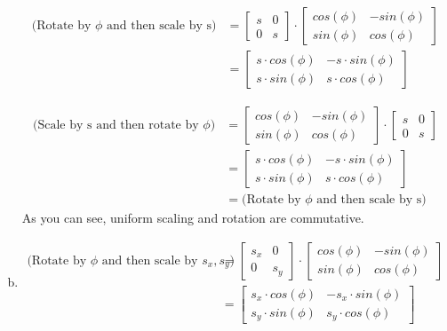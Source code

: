 \documentclass{article} %
\begin{document}
\begin{enumerate}[a)]
\begin{align*}
\text{(Rotate by $\phi$ and then scale by s)} &=
\left[
\begin{matrix}
s & 0\\
0 & s
\end{matrix}
\right]
\cdot
\left[
\begin{matrix}
cos(\phi) & -sin(\phi)\\
sin(\phi) & cos(\phi)
\end{matrix}
\right]\\
&= \left[
\begin{matrix}
s \cdot cos(\phi)  & -s \cdot sin(\phi)\\
s \cdot sin(\phi) & s \cdot cos(\phi)
\end{matrix}
\right]
\end{align*}

\begin{align*}
\text{(Scale by s and then rotate by $\phi$)} &=
\left[
\begin{matrix}
cos(\phi) & -sin(\phi)\\
sin(\phi) & cos(\phi)
\end{matrix}
\right]
\cdot
\left[
\begin{matrix}
s & 0\\
0 & s
\end{matrix}
\right]
\\
&= \left[
\begin{matrix}
s \cdot cos(\phi)  & -s \cdot sin(\phi)\\
s \cdot sin(\phi) & s \cdot cos(\phi)
\end{matrix}
\right]\\
&= \text{(Rotate by $\phi$ and then scale by s)}
\end{align*}
As you can see, uniform scaling and rotation are commutative.

\item

\begin{align*}
\text{(Rotate by $\phi$ and then scale by $s_x, s_y$)} &=
\left[
\begin{matrix}
s_x & 0\\
0 & s_y
\end{matrix}
\right]
\cdot
\left[
\begin{matrix}
cos(\phi) & -sin(\phi)\\
sin(\phi) & cos(\phi)
\end{matrix}
\right]\\
&= \left[
\begin{matrix}
s_x \cdot cos(\phi)  & -s_x \cdot sin(\phi)\\
s_y \cdot sin(\phi) & s_y \cdot cos(\phi)
\end{matrix}
\right]
\end{align*}


\end{enumerate}
\end{document}
